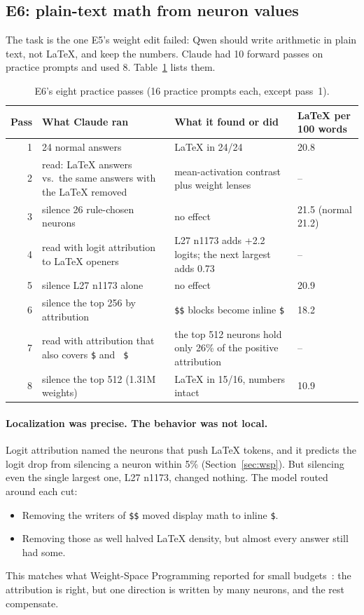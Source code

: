 \subsection{E6: plain-text math from neuron values}
\label{sec:e6}
The task is the one E5's weight edit failed: Qwen should write arithmetic in plain text, not LaTeX, and keep the numbers. Claude had 10 forward passes on practice prompts and used 8. Table~\ref{tab:e6} lists them.

\begin{table}[t]\centering\small
\begin{tabular}{rp{4.9cm}p{5.4cm}p{1.9cm}}\toprule
Pass & What Claude ran & What it found or did & LaTeX per 100 words\\\midrule
1 & 24 normal answers & LaTeX in 24/24 & 20.8\\
2 & read: LaTeX answers vs.\ the same answers with the LaTeX removed & mean-activation contrast plus weight lenses & --\\
3 & silence 26 rule-chosen neurons & no effect & 21.5 (normal 21.2)\\
4 & read with logit attribution to LaTeX openers & L27 n1173 adds +2.2 logits; the next largest adds 0.73 & --\\
5 & silence L27 n1173 alone & no effect & 20.9\\
6 & silence the top 256 by attribution & \texttt{\$\$} blocks become inline \texttt{\$} & 18.2\\
7 & read with attribution that also covers \texttt{\$} and \texttt{\ \$} & the top 512 neurons hold only 26\% of the positive attribution & --\\
8 & silence the top 512 (1.31M weights) & LaTeX in 15/16, numbers intact & 10.9\\\bottomrule
\end{tabular}
\caption{E6's eight practice passes (16 practice prompts each, except pass~1).}
\label{tab:e6}
\end{table}

\paragraph{Localization was precise. The behavior was not local.}
Logit attribution named the neurons that push LaTeX tokens, and it predicts the logit drop from silencing a neuron within 5\% (Section~\ref{sec:wsp}). But silencing even the single largest one, L27 n1173, changed nothing. The model routed around each cut:
\begin{itemize}
\item Removing the writers of \texttt{\$\$} moved display math to inline \texttt{\$}.
\item Removing those as well halved LaTeX density, but almost every answer still had some.
\end{itemize}
This matches what Weight-Space Programming reported for small budgets~\cite{takehi2026wsp}: the attribution is right, but one direction is written by many neurons, and the rest compensate.

